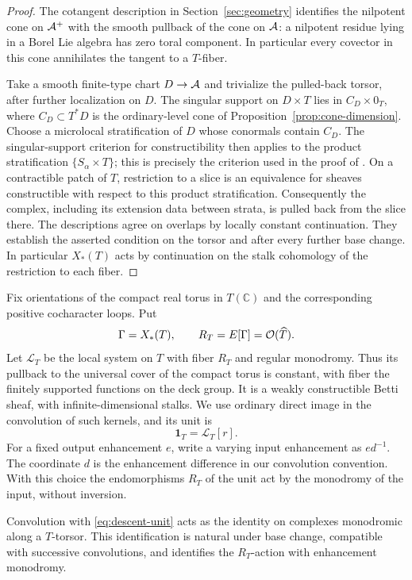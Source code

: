 \begin{proof}
The cotangent description in Section~\ref{sec:geometry} identifies the
nilpotent cone on $\mathcal A^+$ with the smooth pullback of the cone on $\mathcal A$:
a nilpotent residue lying in a Borel Lie algebra has zero toral
component.  In particular every covector in this cone annihilates the
tangent to a $T$-fiber.

Take a smooth finite-type chart $D\to\mathcal A$ and trivialize the pulled-back
torsor, after further localization on $D$.  The singular support on
$D\times T$ lies in $C_D\times 0_T$, where $C_D\subset T^*D$ is the
ordinary-level cone of Proposition~\ref{prop:cone-dimension}.  Choose a
microlocal stratification of $D$ whose conormals contain $C_D$.
The singular-support criterion for constructibility then applies to
the product stratification $\{S_\alpha\times T\}$; this is precisely
the criterion used in the proof of \cite[Proposition~6.3.2]{NY}.
On a contractible patch of $T$, restriction to a slice is an
equivalence for sheaves constructible with respect to this product
stratification.  Consequently the complex, including its extension
data between strata, is pulled back from the slice there.
The descriptions agree on overlaps by locally constant continuation.
They establish the asserted condition on the torsor and after every
further base change.  In particular $X_*(T)$ acts by continuation on
the stalk cohomology of the restriction to each fiber.
\end{proof}

Fix orientations of the compact real torus in $T(\mathbb C)$ and the
corresponding positive cocharacter loops.  Put
\[
 \Gamma=X_*(T),\qquad
 R_T=E[\Gamma]=\mathcal O(\widehat T).
\]
Let $\mathscr L_T$ be the local system on $T$ with fiber $R_T$ and
regular monodromy.  Thus its pullback to the universal cover of the
compact torus is constant, with fiber the finitely supported functions
on the deck group.  It is a weakly constructible Betti sheaf, with
infinite-dimensional stalks.  We use ordinary direct image in the
convolution of such kernels, and its unit is
\begin{equation}\label{eq:descent-unit}
 \mathbf 1_T=\mathscr L_T[r].
\end{equation}
For a fixed output enhancement $e$, write a varying input enhancement
as $e d^{-1}$.  The coordinate $d$ is the enhancement difference in our
convolution convention.  With this choice the endomorphisms $R_T$ of
the unit act by the monodromy of the input, without inversion.

\begin{lemma}\label{lem:descent-unit}
Convolution with \eqref{eq:descent-unit} acts as the identity on
complexes monodromic along a $T$-torsor.  This identification is natural
under base change, compatible with successive convolutions, and
identifies the $R_T$-action with enhancement monodromy.
\end{lemma}


